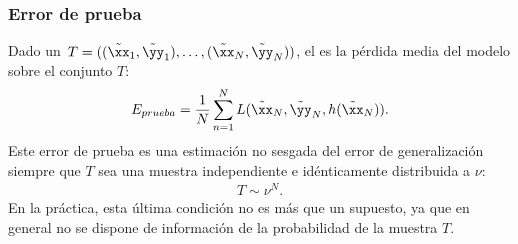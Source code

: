 %
\subsubsection{Error de prueba}
%
Dado un 
$\,T=((\tilde{\xx}_1,\tilde{\yy}_1),\ldots,(\tilde{\xx}_N,\tilde{\yy}_N))$, el
 es la pérdida media del modelo sobre el conjunto $T$:
%
\begin{align}
  E_{prueba}=\frac{1}{N}\sum_{n=1}^N
  L(\tilde{\xx}_N,\tilde{\yy}_N,h(\tilde{\xx}_N)).
  \label{eq:error-prueba}
\end{align}
%
Este error de prueba es una estimación no sesgada del error de
generalización siempre que $T$ sea una muestra independiente e
idénticamente distribuida a $\nu$:
%
\begin{align}
  T\sim\nu^N.
  \label{eq:conj-prueba-sim-nu}
\end{align}
%
En la práctica, esta última condición no es más que un supuesto,
ya que en general no se dispone de información de la probabilidad
de la muestra $T$.
